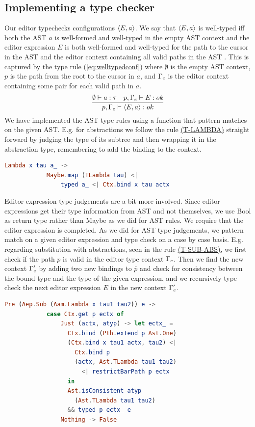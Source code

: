 \subsection{Implementing a type checker}

Our editor typechecks configurations $\langle E,a \rangle$. We say that
$\langle E,a \rangle$ is well-typed iff both the AST $a$ is
well-formed and well-typed in the empty AST context and the editor
expression $E$
is both well-formed and well-typed for the path to the cursor in the AST and
the editor context containing all valid paths in the AST \pepm. This
is captured by the type rule
(\ref{eq:welltypedconf}) where $\emptyset$ is the empty AST context, $p$ is the
path from the root to the cursor in $a$, and $\Gamma_{e}$ is the editor context
containing some pair for each valid path in $a$.
%
\begin{equation}\label{eq:welltypedconf}
  \frac{\emptyset \vdash a : \tau \quad p,\Gamma_{e} \vdash E : ok} {p,\Gamma_{e} \vdash \langle E,a \rangle : ok}\\ 
\end{equation}
%
We have implemented the AST type rules using a function that pattern
matches on the given AST. E.g. for abstractions we follow the rule
\hyperref[fig:asttyperules]{(T-LAMBDA)} straight forward by judging
the type of its subtree and then wrapping it in the abstraction type,
remembering to add the binding to the context.

\begin{lstlisting}[language=elm,%
                    gobble=8,%
                    mathescape,%
                    ]
        Lambda x tau a_ ->
            Maybe.map (TLambda tau) <|
                typed a_ <| Ctx.bind x tau actx
\end{lstlisting}

Editor expression type judgements are a bit more involved. Since
editor expressions get their type information from AST and not
themselves, we use Bool as return type rather than Maybe as we did for
AST rules. We require that the editor expression is completed. As we
did for AST type judgements, we pattern match on a given editor
expression and type check on a case by case basis.  E.g. regarding
substitution with abstractions, seen in the rule
\hyperref[fig:edttyperules]{(T-SUB-ABS)}, we first check if the path
$p$ is valid in the editor type context $\Gamma_{e}$. Then we find the
new context $\Gamma_{e}'$ by adding two new bindings to $\bar{p}$ and
check for consistency between the bound type and the type of the given
expression, and we recursively type check the next editor expression
$E$ in the new context $\Gamma_{e}'$.
\begin{lstlisting}[language=elm,%
                    gobble=8,%
                    mathescape,%
                    ]
        Pre (Aep.Sub (Aam.Lambda x tau1 tau2)) e ->
            case Ctx.get p ectx of
                Just (actx, atyp) -> let ectx_ =
                  Ctx.bind (Pth.extend p Ast.One)
                  (Ctx.bind x tau1 actx, tau2) <|
                    Ctx.bind p
                    (actx, Ast.TLambda tau1 tau2)
                      <| restrictBarPath p ectx
                  in
                  Ast.isConsistent atyp
                    (Ast.TLambda tau1 tau2)
                  && typed p ectx_ e
                Nothing -> False
\end{lstlisting}

